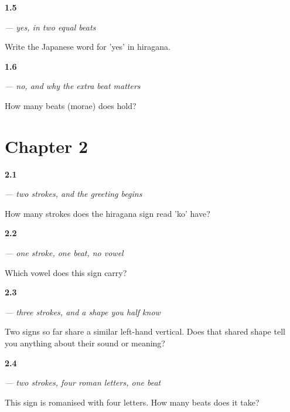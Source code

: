 \noindent\begin{minipage}[t]{\linewidth}
\raggedright
\hypertarget{review-JA-C01-hai-beats}{\textbf{1.5}} \emph{ — yes, in two equal beats}\par
\small Write the Japanese word for 'yes' in hiragana.
\end{minipage}\par\medskip

\noindent\begin{minipage}[t]{\linewidth}
\raggedright
\hypertarget{review-JA-C01-iie-length}{\textbf{1.6}} \emph{ — no, and why the extra beat matters}\par
\small How many beats (morae) does  hold?
\end{minipage}\par\medskip

\section*{Chapter 2}

\noindent\begin{minipage}[t]{\linewidth}
\raggedright
\hypertarget{review-JA-W01-ko-strokes}{\textbf{2.1}} \emph{ — two strokes, and the greeting begins}\par
\small How many strokes does the hiragana sign read 'ko' have?
\end{minipage}\par\medskip

\noindent\begin{minipage}[t]{\linewidth}
\raggedright
\hypertarget{review-JA-W01-n-vowel}{\textbf{2.2}} \emph{ — one stroke, one beat, no vowel}\par
\small Which vowel does this sign carry?
\end{minipage}\par\medskip

\noindent\begin{minipage}[t]{\linewidth}
\raggedright
\hypertarget{review-JA-W01-ni-shared}{\textbf{2.3}} \emph{ — three strokes, and a shape you half know}\par
\small Two signs so far share a similar left-hand vertical. Does that shared shape tell you anything about their sound or meaning?
\end{minipage}\par\medskip

\noindent\begin{minipage}[t]{\linewidth}
\raggedright
\hypertarget{review-JA-W01-chi-beats}{\textbf{2.4}} \emph{ — two strokes, four roman letters, one beat}\par
\small This sign is romanised with four letters. How many beats does it take?
\end{minipage}\par\medskip

